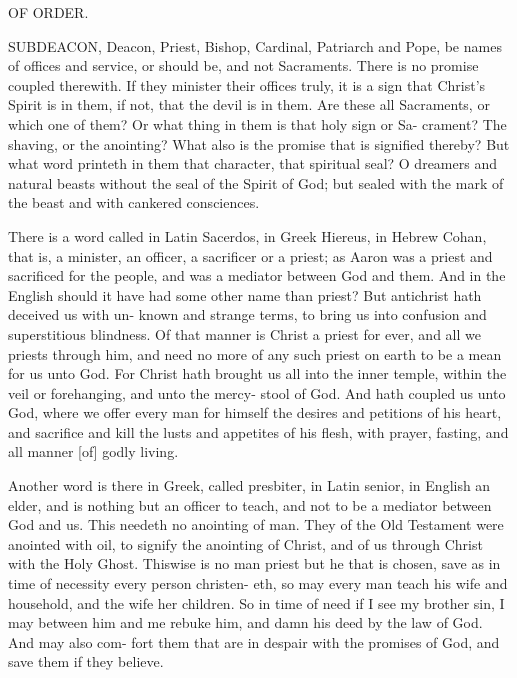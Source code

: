 \documentclass{custom}
\begin{document}
OF ORDER. 

SUBDEACON, Deacon, Priest, Bishop, Cardinal, 
Patriarch and Pope, be names of offices and service, or 
should be, and not Sacraments. There is no promise 
coupled therewith. If they minister their offices truly, it 
is a sign that Christ's Spirit is in them, if not, that the 
devil is in them. Are these all Sacraments, or which one 
of them? Or what thing in them is that holy sign or Sa- 
crament? The shaving, or the anointing? What also is 
the promise that is signified thereby? But what word 
printeth in them that character, that spiritual seal? O 
dreamers and natural beasts without the seal of the Spirit 
of God; but sealed with the mark of the beast and with 
cankered consciences. 

There is a word called in Latin Sacerdos, in Greek 
Hiereus, in Hebrew Cohan, that is, a minister, an officer, 
a sacrificer or a priest; as Aaron was a priest and sacrificed 
for the people, and was a mediator between God and them. 
And in the English should it have had some other name 
than priest? But antichrist hath deceived us with un- 
known and strange terms, to bring us into confusion and 
superstitious blindness. Of that manner is Christ a 
priest for ever, and all we priests through him, and need no 
more of any such priest on earth to be a mean for us 
unto God. For Christ hath brought us all into the inner 
temple, within the veil or forehanging, and unto the mercy- 
stool of God. And hath coupled us unto God, where 
we offer every man for himself the desires and petitions of 
his heart, and sacrifice and kill the lusts and appetites of 
his flesh, with prayer, fasting, and all manner [of] godly 
living. 

Another word is there in Greek, called presbiter, in 
Latin senior, in English an elder, and is nothing but an 
officer to teach, and not to be a mediator between God 
and us. This needeth no anointing of man. They of 
the Old Testament were anointed with oil, to signify the 
anointing of Christ, and of us through Christ with the 
Holy Ghost. Thiswise is no man priest but he that is 
chosen, save as in time of necessity every person christen- 
eth, so may every man teach his wife and household, and 
the wife her children. So in time of need if I see my 
brother sin, I may between him and me rebuke him, and 
damn his deed by the law of God. And may also com- 
fort them that are in despair with the promises of God, 
and save them if they believe. 
\end{document}
